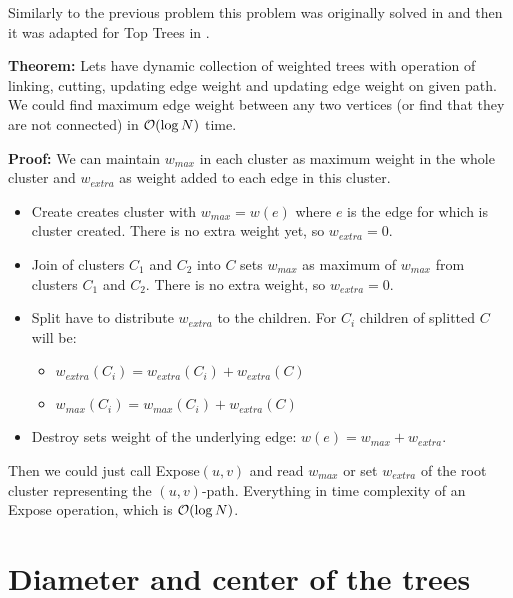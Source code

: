 Similarly to the previous problem this problem was originally solved in
\cite{DSforDynamicTrees} and then it was adapted for Top Trees  in
\cite{TopTrees}.

{\bf Theorem:} Lets have dynamic collection of weighted trees with operation of linking,
cutting, updating edge weight and updating edge weight on given path. We could
find maximum edge weight between any two vertices (or find that they are not
connected) in ${\cal O}(\log N)$ time.

\medskip\noindent
{\bf Proof:} We can maintain $w_{max}$ in each cluster as maximum weight in the
whole cluster and $w_{extra}$ as weight added to each edge in this cluster.

\begin{itemize}

\item {\sc Create} creates cluster with $w_{max}=w(e)$ where $e$ is the edge for
which is cluster created. There is no extra weight yet, so $w_{extra}=0$.

\item {\sc Join} of clusters $C_1$ and $C_2$ into $C$ sets $w_{max}$ as maximum
of $w_{max}$ from clusters $C_1$ and $C_2$. There is no extra weight, so $w_{extra}=0$.

\item {\sc Split} have to distribute $w_{extra}$ to the children. For $C_i$ children
of splitted $C$ will be:
	\begin{itemize}[$\circ$]
	\item $w_{extra}(C_i)=w_{extra}(C_i)+w_{extra}(C)$
	\item $w_{max}(C_i)=w_{max}(C_i)+w_{extra}(C)$
	\end{itemize}

\item {\sc Destroy} sets weight of the underlying edge: $w(e)=w_{max}+w_{extra}$.

\end{itemize}

Then we could just call {\sc Expose}$(u,v)$ and read $w_{max}$ or set $w_{extra}$
of the root cluster representing the $(u,v)$-path. Everything in time complexity
of an {\sc Expose} operation, which is ${\cal O}(\log N)$.


\section{Diameter and center of the trees}

